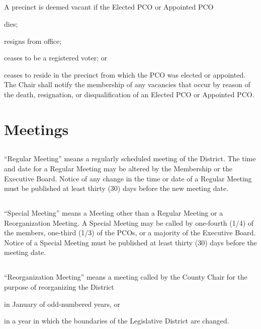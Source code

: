 \documentclass{article}
\newcommand{\fortythird}{\nth{43}}
\newcommand{\district}{\fortythird{} District}
\newcommand{\thedistrict}{the \district{}}
\begin{document}
\subsection{}
A precinct is deemed vacant if the Elected PCO or Appointed PCO
\begin{inlinealphalist}
    \item dies;
    \item resigns from office;
    \item ceases to be a registered voter; or
    \item ceases to reside in the precinct from which the PCO was elected or appointed. The Chair shall notify the membership of any vacancies that occur by reason of the death, resignation, or disqualification of an Elected PCO or Appointed PCO.
\end{inlinealphalist}

\section{Meetings}
\subsection{}
“Regular Meeting” means a regularly scheduled meeting of \thedistrict{}. The time and date for a Regular Meeting may be altered by the Membership or the Executive Board. Notice of any change in the time or date of a Regular Meeting must be published at least thirty (30) days before the new meeting date.

\subsection{}
“Special Meeting” means a Meeting other than a Regular Meeting or a Reorganization Meeting. A Special Meeting may be called by one-fourth (1/4) of the members, one-third (1/3) of the PCOs, or a majority of the Executive Board. Notice of a Special Meeting must be published at least thirty (30) days before the meeting date.

\subsection{}
“Reorganization Meeting” means a meeting called by the County Chair for the purpose of reorganizing \thedistrict{}
\begin{inlinealphalist}
    \item in January of odd-numbered years, or
    \item in a year in which the boundaries of the Legislative District are changed.
\end{inlinealphalist}
\end{document}
